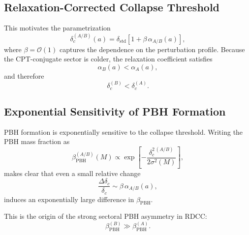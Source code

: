 \documentclass[11pt,a4paper]{article}
\begin{document}

\subsection{Relaxation-Corrected Collapse Threshold}

This motivates the parametrization
\begin{equation}
\delta_{c}^{(A/B)}(a) = \delta_{\mathrm{std}}
\left[ 1 + \beta\, \alpha_{A/B}(a) \right],
\end{equation}
where \(\beta = \mathcal{O}(1)\) captures the dependence on the perturbation profile. Because the
CPT-conjugate sector is colder, the relaxation coefficient satisfies
\begin{equation}
\alpha_{B}(a) < \alpha_{A}(a),
\end{equation}
and therefore
\begin{equation}
\delta_{c}^{(B)} < \delta_{c}^{(A)}.
\end{equation}


\subsection{Exponential Sensitivity of PBH Formation}

PBH formation is exponentially sensitive to the collapse threshold. Writing the PBH mass
fraction as
\begin{equation}
\beta_{\mathrm{PBH}}^{(A/B)}(M)
\propto
\exp\!\left[
-\frac{\delta_{c}^{2\,(A/B)}}{2\sigma^{2}(M)}
\right],
\end{equation}
makes clear that even a small relative change
\begin{equation}
\frac{\Delta \delta_{c}}{\delta_{c}}
\sim
\beta\, \alpha_{A/B}(a),
\end{equation}
induces an exponentially large difference in \(\beta_{\mathrm{PBH}}\).

This is the origin of the strong sectoral PBH asymmetry in RDCC:
\begin{equation}
\beta_{\mathrm{PBH}}^{(B)} \gg \beta_{\mathrm{PBH}}^{(A)}.
\end{equation}
\end{document}
